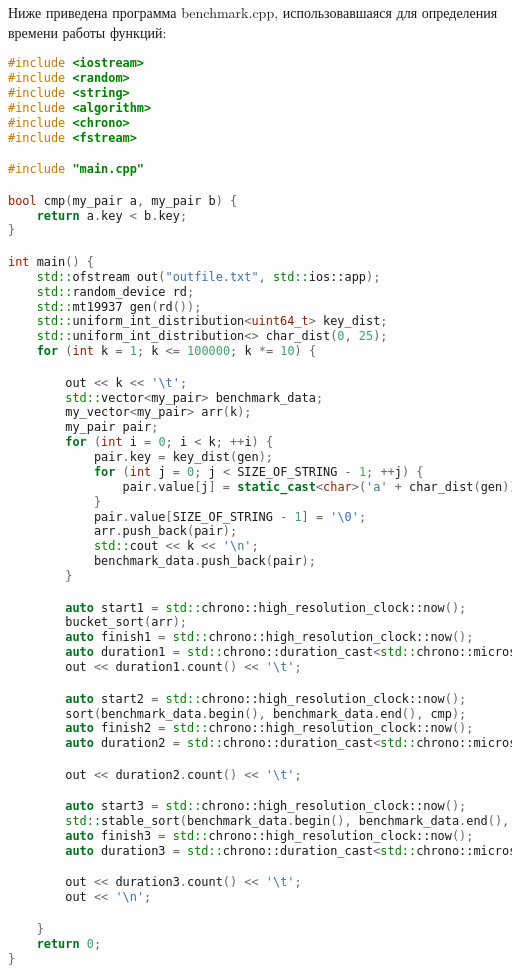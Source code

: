 \documentclass[12pt]{article}
\begin{document}
Ниже приведена программа benchmark.cpp, использовавшаяся для определения времени работы функций:
\begin{lstlisting}[language=C++]
#include <iostream>
#include <random>
#include <string>
#include <algorithm>
#include <chrono>
#include <fstream>

#include "main.cpp"

bool cmp(my_pair a, my_pair b) {
    return a.key < b.key;
}

int main() {
    std::ofstream out("outfile.txt", std::ios::app);
    std::random_device rd;
    std::mt19937 gen(rd());
    std::uniform_int_distribution<uint64_t> key_dist;
    std::uniform_int_distribution<> char_dist(0, 25);
    for (int k = 1; k <= 100000; k *= 10) {

        out << k << '\t';
        std::vector<my_pair> benchmark_data;
        my_vector<my_pair> arr(k);
        my_pair pair;
        for (int i = 0; i < k; ++i) {
            pair.key = key_dist(gen);
            for (int j = 0; j < SIZE_OF_STRING - 1; ++j) {
                pair.value[j] = static_cast<char>('a' + char_dist(gen));
            }
            pair.value[SIZE_OF_STRING - 1] = '\0';
            arr.push_back(pair);
            std::cout << k << '\n';
            benchmark_data.push_back(pair);
        }

        auto start1 = std::chrono::high_resolution_clock::now();
        bucket_sort(arr);
        auto finish1 = std::chrono::high_resolution_clock::now();
        auto duration1 = std::chrono::duration_cast<std::chrono::microseconds>(finish1 - start1);
        out << duration1.count() << '\t';

        auto start2 = std::chrono::high_resolution_clock::now();
        sort(benchmark_data.begin(), benchmark_data.end(), cmp);
        auto finish2 = std::chrono::high_resolution_clock::now();
        auto duration2 = std::chrono::duration_cast<std::chrono::microseconds>(finish2 - start2);

        out << duration2.count() << '\t';

        auto start3 = std::chrono::high_resolution_clock::now();
        std::stable_sort(benchmark_data.begin(), benchmark_data.end(), cmp);
        auto finish3 = std::chrono::high_resolution_clock::now();
        auto duration3 = std::chrono::duration_cast<std::chrono::microseconds>(finish3 - start3);

        out << duration3.count() << '\t';
        out << '\n';

    }
    return 0;
}



\end{lstlisting}
\end{document}
